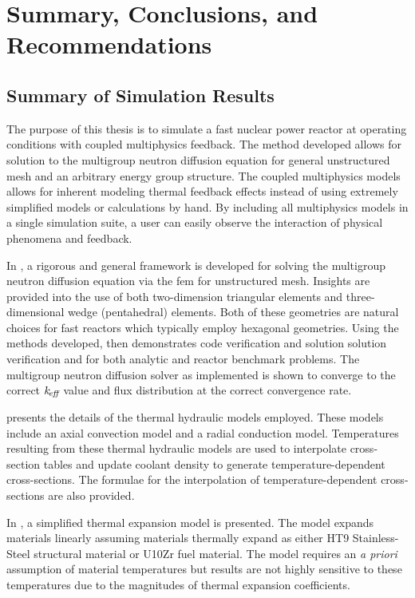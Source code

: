 \chapter{Summary, Conclusions, and Recommendations}
\label{ch:conclusions}

\section{Summary of Simulation Results}

  The purpose of this thesis is to simulate a fast nuclear power reactor at 
  operating conditions with coupled multiphysics feedback. The method
  developed allows for solution to the multigroup neutron diffusion equation for
  general unstructured mesh and an arbitrary energy group structure. The coupled 
  multiphysics models allows for inherent modeling thermal feedback effects 
  instead of using extremely simplified models or calculations by hand. By 
  including all multiphysics models in a single simulation suite, a user can 
  easily observe the interaction of physical phenomena and feedback.

  In , a rigorous and general framework is developed
  for solving the multigroup neutron diffusion equation via the \gls{fem} for
  unstructured mesh. Insights are provided into the use of both
  two-dimension triangular elements and three-dimensional wedge (pentahedral)
  elements. Both of these geometries are natural choices for fast reactors which 
  typically employ hexagonal geometries. Using the methods developed,
   then demonstrates code verification and solution
  solution verification and for both analytic and reactor benchmark problems. 
  The multigroup neutron diffusion solver as implemented is shown to converge to 
  the correct $k_{\!\mbox{\scriptsize \em eff}}$ value and flux distribution at the correct convergence 
  rate.

   presents the details of the thermal hydraulic
  models employed. These models include an axial convection model and a radial
  conduction model. Temperatures resulting from these thermal hydraulic models
  are used to interpolate cross-section tables and update coolant density to 
  generate temperature-dependent cross-sections. The formulae for the 
  interpolation of temperature-dependent cross-sections are also provided.

  In , a simplified thermal expansion model is
  presented. The model expands materials linearly assuming materials thermally
  expand as either HT9 Stainless-Steel structural material or U10Zr fuel 
  material. The model requires an \textit{a priori} assumption of material 
  temperatures but results are not highly sensitive to these temperatures due 
  to the magnitudes of thermal expansion coefficients.

